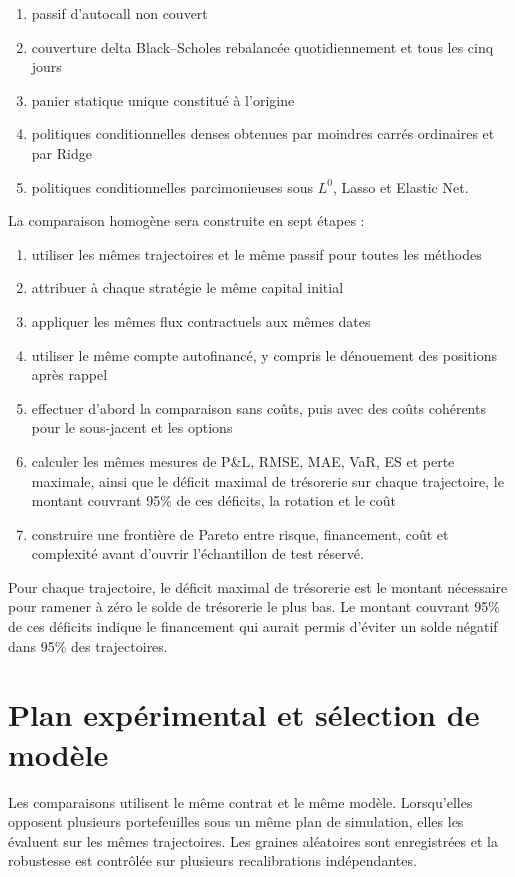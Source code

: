\documentclass[12pt,a4paper]{article}
\newcommand{\1}{\mathbf{1}}
\begin{document}
\begin{enumerate}
\item passif d'autocall non couvert
\item couverture delta Black--Scholes rebalancée quotidiennement et tous les cinq jours
\item panier statique unique constitué à l'origine
\item politiques conditionnelles denses obtenues par moindres carrés ordinaires et par Ridge
\item politiques conditionnelles parcimonieuses sous $L^0$, Lasso et Elastic Net.
\end{enumerate}

\noindent La comparaison homogène sera construite en sept étapes :

\begin{enumerate}
\item utiliser les mêmes trajectoires et le même passif pour toutes les méthodes
\item attribuer à chaque stratégie le même capital initial
\item appliquer les mêmes flux contractuels aux mêmes dates
\item utiliser le même compte autofinancé, y compris le dénouement des positions après rappel
\item effectuer d'abord la comparaison sans coûts, puis avec des coûts cohérents pour le sous-jacent et les options
\item calculer les mêmes mesures de P\&L, RMSE, MAE, VaR, ES et perte maximale, ainsi que le déficit maximal de trésorerie sur chaque trajectoire, le montant couvrant 95\% de ces déficits, la rotation et le coût
\item construire une frontière de Pareto entre risque, financement, coût et complexité avant d'ouvrir l'échantillon de test réservé.
\end{enumerate}

Pour chaque trajectoire, le déficit maximal de trésorerie est le montant nécessaire
pour ramener à zéro le solde de trésorerie le plus bas. Le montant couvrant 95\% de
ces déficits indique le financement qui aurait permis d'éviter un solde négatif dans
95\% des trajectoires.

\section{Plan expérimental et sélection de modèle}

Les comparaisons utilisent le même contrat et le même modèle. Lorsqu'elles opposent plusieurs portefeuilles sous un même plan de simulation, elles les évaluent sur les mêmes trajectoires. Les graines aléatoires sont enregistrées et la
robustesse est contrôlée sur plusieurs recalibrations indépendantes.
\end{document}
